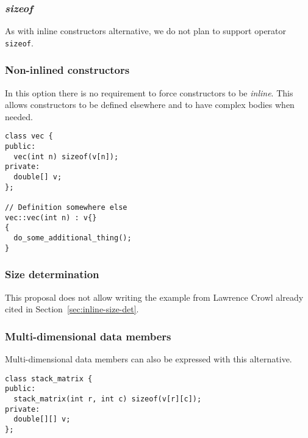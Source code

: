 \subsubsection{\emph{sizeof}}

As with inline constructors alternative, we do not plan to support operator
\verb+sizeof+.

\subsubsection{Non-inlined constructors}

In this option there is no requirement to force constructors to be
\emph{inline}. This allows constructors to be defined elsewhere and to have
complex bodies when needed.

\begin{lstlisting}
class vec {
public:
  vec(int n) sizeof(v[n]);
private:
  double[] v;
};

// Definition somewhere else
vec::vec(int n) : v{}
{
  do_some_additional_thing();
}
\end{lstlisting}

\subsubsection{Size determination}

This proposal does not allow writing the example from Lawrence Crowl already cited
in Section~\ref{sec:inline-size-det}.

\subsubsection{Multi-dimensional data members}

Multi-dimensional data members can also be expressed with this alternative.

\begin{lstlisting}
class stack_matrix {
public:
  stack_matrix(int r, int c) sizeof(v[r][c]);
private:
  double[][] v;
};
\end{lstlisting}
